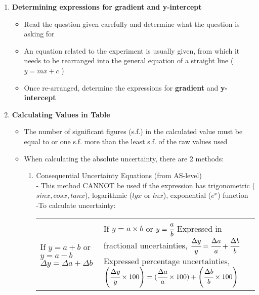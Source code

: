 \documentclass{article}
\begin{document}
\begin{enumerate}
    \item \textbf{Determining expressions for gradient and y-intercept}
    \begin{itemize}
        \item Read the question given carefully and determine what the question is asking for
        \item 	An equation related to the experiment is usually given, from which it needs to be rearranged into the general equation of a straight line ( $y=mx+c$ )
        \item 	Once re-arranged, determine the expressions for \textbf{gradient} and \textbf{y-intercept}
    \end{itemize}
    \item \textbf{Calculating Values in Table}
    \begin{itemize}
        \item The number of significant figures (s.f.) in the calculated value must be equal to or one s.f. more than the least s.f. of the raw values used
        \item When calculating the absolute uncertainty, there are 2 methods:
        \begin{enumerate}
            \item Consequential Uncertainty Equations (from AS-level)\\
            -	This method CANNOT be used if the expression has trigonometric ($sin x, cos x, tan x$), logarithmic ($lg x$ or $ln x$), exponential ($e^x$) function\\
            -To calculate uncertainty:
            \begin{longtable}{|p{7cm}|p{7cm}|}
              \hline
              If $ y= a + b$ or $y = a - b$ \newline
              $\Delta y=\Delta a + \Delta b $ & If $y=a\times b$ or $y=\cfrac{a}{b}$ \newline\newline
              Expressed in fractional uncertainties, \newline
              $\cfrac{\Delta y}{y}=\cfrac{\Delta a}{a}+\cfrac{\Delta b}{b}$ \newline\newline
              Expressed percentage uncertainties, \newline
              $\left(\cfrac{\Delta y}{y}\times 100\right)=(\cfrac{\Delta a}{a}\times 100)+\left(\cfrac{\Delta b}{b}\times 100\right)$ \newline\\

\end{longtable}
\end{enumerate}
\end{itemize}
\end{enumerate}
\end{document}
